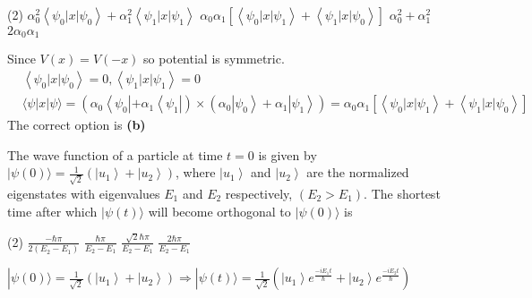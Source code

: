 \begin{enumerate}
	\begin{tasks}(2)
		\task[\textbf{A.}] $\alpha_{0}^{2}\left\langle\psi_{0}|x| \psi_{0}\right\rangle+\alpha_{1}^{2}\left\langle\psi_{1}|x| \psi_{1}\right\rangle$
		\task[\textbf{B.}]$\alpha_{0} \alpha_{1}\left[\left\langle\psi_{0}|x| \psi_{1}\right\rangle+\left\langle\psi_{1}|x| \psi_{0}\right\rangle\right]$
		\task[\textbf{C.}]$\alpha_{0}^{2}+\alpha_{1}^{2}$
		\task[\textbf{D.}]$2 \alpha_{0} \alpha_{1}$
	\end{tasks}
\begin{answer}
 Since $V(x)=V(-x)$ so potential is symmetric.
	$$
	\begin{aligned}
	&\left\langle\psi_{0}|x| \psi_{0}\right\rangle=0,\left\langle\psi_{1}|x| \psi_{1}\right\rangle=0 \\
	&\langle\psi|x| \psi\rangle=\left(\alpha _ { 0 } \left\langle\psi_{0}\left|+\alpha_{1}\left\langle\psi_{1}\right|\right) \times\left(\alpha_{0}\left|\psi_{0}\right\rangle+\alpha_{1}\left|\psi_{1}\right\rangle\right)=\alpha_{0} \alpha_{1}\left[\left\langle\psi_{0}|x| \psi_{1}\right\rangle+\left\langle\psi_{1}|x| \psi_{0}\right\rangle\right]\right.\right.
	\end{aligned}
	$$
	The correct option is \textbf{(b)}
\end{answer}
\begin{minipage}{\textwidth}
	\item The wave function of a particle at time $t=0$ is given by $|\psi(0)\rangle=\frac{1}{\sqrt{2}}\left(\left|u_{1}\right\rangle+\left|u_{2}\right\rangle\right)$, where
	$\left|u_{1}\right\rangle$ and $\left|u_{2}\right\rangle$ are the normalized eigenstates with eigenvalues $E_{1}$ and $E_{2}$ respectively, $\left(E_{2}>E_{1}\right)$. The shortest time after which $|\psi(t)\rangle$ will become orthogonal to $|\psi(0)\rangle$ is
\end{minipage}
\begin{tasks}(2)
	\task[\textbf{A.}] $\frac{-\hbar \pi}{2\left(E_{2}-E_{1}\right)}$
	\task[\textbf{B.}]$\frac{\hbar \pi}{E_{2}-E_{1}}$
	\task[\textbf{C.}]$\frac{\sqrt{2} \hbar \pi}{E_{2}-E_{1}}$
	\task[\textbf{D.}]$\frac{2 \hbar \pi}{E_{2}-E_{1}}$
\end{tasks}
\begin{answer}
	$|\psi(0)\rangle=\frac{1}{\sqrt{2}}\left(\left|u_{1}\right\rangle+\left|u_{2}\right\rangle\right) \Rightarrow|\psi(t)\rangle=\frac{1}{\sqrt{2}}\left(\left|u_{1}\right\rangle e^{\frac{-i E_{1} t}{\hbar}}+\left|u_{2}\right\rangle e^{\frac{-i E_{2} t}{\hbar}}\right)$\\

\end{answer}
\end{enumerate}
